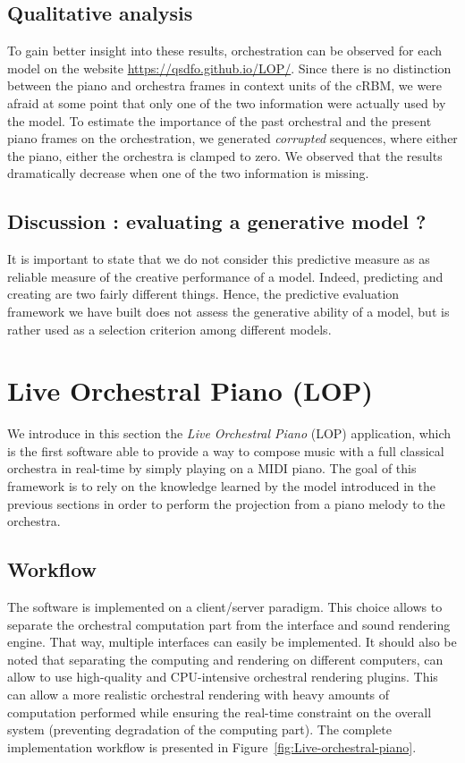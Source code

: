 \documentclass{article}
\begin{document}
\subsection{Qualitative analysis}
To gain better insight into these results, orchestration can be observed for each model on the website \url{https://qsdfo.github.io/LOP/}.
Since there is no distinction between the piano and orchestra frames in context units of the cRBM, we were afraid at some point that only one of the two information were actually used by the model. To estimate the importance of the past orchestral and the present piano frames on the orchestration, we generated \textit{corrupted} sequences, where either the piano, either the orchestra is clamped to zero. We observed that the results dramatically decrease when one of the two information is missing.

\subsection{Discussion : evaluating a generative model ?}
It is important to state that we do not consider this predictive measure as as reliable measure of the creative performance of a model. Indeed, predicting and creating are two fairly different things. 
Hence, the predictive evaluation framework we have built does not assess the generative ability of a model, but is rather used as a selection criterion among different models.

\section{Live Orchestral Piano (LOP)}
We introduce in this section the \emph{Live Orchestral Piano} (LOP)
application, which is the first software able to provide a way to
compose music with a full classical orchestra in real-time by simply
playing on a MIDI piano. The goal of this framework is to rely on
the knowledge learned by the model introduced in the previous sections
in order to perform the projection from a piano melody to the orchestra.

\subsection{Workflow}
The software is implemented on a client/server paradigm. This choice
allows to separate the orchestral computation part from the interface
and sound rendering engine. That way, multiple interfaces can easily
be implemented. It should also be noted that separating the computing
and rendering on different computers, can allow to use high-quality
and CPU-intensive orchestral rendering plugins. This can allow a more
realistic orchestral rendering with heavy amounts of computation performed
while ensuring the real-time constraint on the overall system (preventing
degradation of the computing part). The complete implementation workflow
is presented in Figure~\ref{fig:Live-orchestral-piano}.
\end{document}
